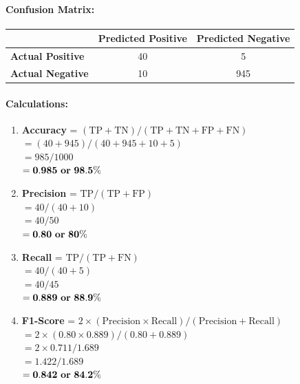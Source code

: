 \documentclass[11pt,a4paper]{article}
\begin{document}
\paragraph{Confusion Matrix:}
\begin{center}
\begin{tabular}{lcc}
\toprule
& \textbf{Predicted Positive} & \textbf{Predicted Negative} \\
\midrule
\textbf{Actual Positive} & 40 & 5 \\
\textbf{Actual Negative} & 10 & 945 \\
\bottomrule
\end{tabular}
\end{center}

\paragraph{Calculations:}
\begin{enumerate}[label=\textbf{(\alph*)}]
    \item \textbf{Accuracy} = $(\text{TP} + \text{TN}) / (\text{TP} + \text{TN} + \text{FP} + \text{FN})$\\
    $= (40 + 945) / (40 + 945 + 10 + 5)$\\
    $= 985 / 1000$\\
    $= \mathbf{0.985 \text{ \textbf{or} } 98.5\%}$

    \item \textbf{Precision} = $\text{TP} / (\text{TP} + \text{FP})$\\
    $= 40 / (40 + 10)$\\
    $= 40 / 50$\\
    $= \mathbf{0.80 \text{ \textbf{or} } 80\%}$

    \item \textbf{Recall} = $\text{TP} / (\text{TP} + \text{FN})$\\
    $= 40 / (40 + 5)$\\
    $= 40 / 45$\\
    $= \mathbf{0.889 \text{ \textbf{or} } 88.9\%}$

    \item \textbf{F1-Score} = $2 \times (\text{Precision} \times \text{Recall}) / (\text{Precision} + \text{Recall})$\\
    $= 2 \times (0.80 \times 0.889) / (0.80 + 0.889)$\\
    $= 2 \times 0.711 / 1.689$\\
    $= 1.422 / 1.689$\\
    $= \mathbf{0.842 \text{ \textbf{or} } 84.2\%}$
\end{enumerate}
\end{document}
